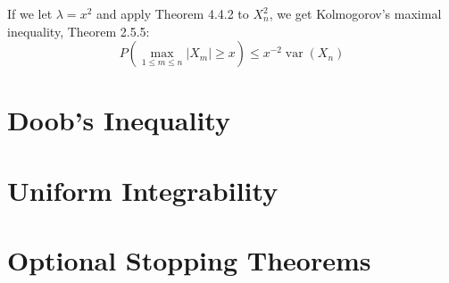 \begin{remark}
	If we let $\lambda=x^{2}$ and apply Theorem 4.4.2 to $X_{n}^{2}$, we get Kolmogorov's maximal inequality, Theorem 2.5.5:
	\begin{equation}
		P\left(\max_{1\leq m\leq n}\left|X_{m}\right|\geq x\right)\leq x^{-2}\operatorname{var}\left(X_{n}\right)
	\end{equation}
\end{remark}

\begin{theorem}

\end{theorem}

\begin{theorem}

\end{theorem}

\begin{definition}

\end{definition}

\begin{definition}

\end{definition}

\begin{theorem}

\end{theorem}

\section{Doob's Inequality}

\begin{theorem}

\end{theorem}

\begin{theorem}

\end{theorem}

\begin{theorem}

\end{theorem}

\section{Uniform Integrability}

\section{Optional Stopping Theorems}
